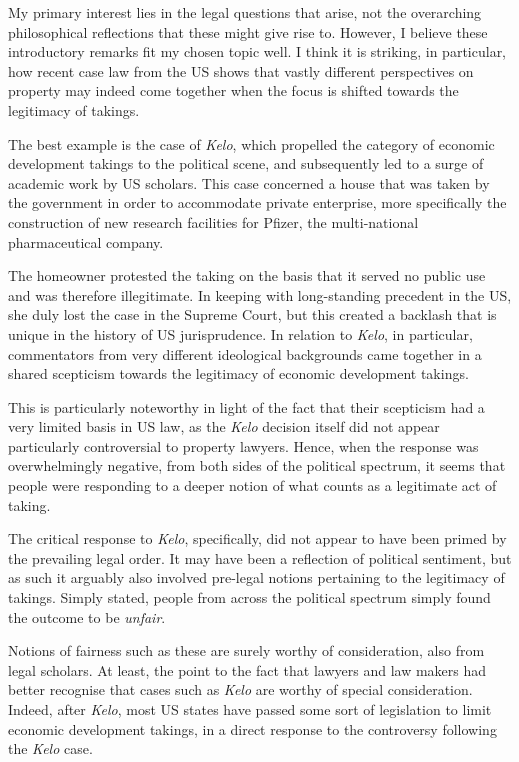 My primary interest lies in the legal questions that arise, not the overarching philosophical reflections that these might give rise to. However, I believe these introductory remarks fit my chosen topic well. I think it is striking, in particular, how recent case law from the US shows that vastly different perspectives on property may indeed come together when the focus is shifted towards the legitimacy of takings.

The best example is the case of {\it Kelo}, which propelled the category of economic development takings to the political scene, and subsequently led to a surge of academic work by US scholars. 
This case concerned a house that was taken by the government in order to accommodate private enterprise, more specifically the construction of new research facilities for Pfizer, the multi-national pharmaceutical company.

The homeowner protested the taking on the basis that it served no public use and was therefore illegitimate. In keeping with long-standing precedent in the US, she duly lost the case in the Supreme Court, but this created a backlash that is unique in the history of US jurisprudence. 
In relation to {\it Kelo}, in particular, commentators from very different ideological backgrounds came together in a shared scepticism towards the legitimacy of economic development takings.

This is particularly noteworthy in light of the fact that their scepticism had a very limited basis in US law, as the {\it Kelo} decision itself did not appear particularly controversial to property lawyers. Hence, when the response was overwhelmingly negative, from both sides of the political spectrum, it seems that people were responding to a deeper notion of what counts as a legitimate act of taking. 

The critical response to {\it Kelo}, specifically, did not appear to have been primed by the prevailing legal order. It may have been a reflection of political sentiment, but as such it arguably also involved pre-legal notions pertaining to the legitimacy of takings. Simply stated, people from across the political spectrum simply found the outcome to be {\it unfair}.

Notions of fairness such as these are surely worthy of consideration, also from legal scholars.  
At least, the point to the fact that lawyers and law makers had better recognise that cases such as {\it Kelo} are worthy of special consideration. Indeed, after {\it Kelo}, most US states have passed some sort of legislation to limit economic development takings, in a direct response to the controversy following the {\it Kelo} case. 

